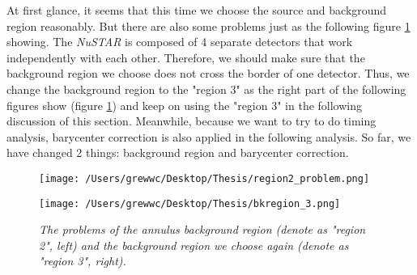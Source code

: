 \documentclass[12pt]{report}
\newcommand{\mycaption}[1]{\caption{\textit{\footnotesize #1}}}
\begin{document}
        \indent At first glance, it seems that this time we choose the source and background region reasonably. But 
        there %
        are also some problems just as the following figure \ref{fig:problems} showing. The \textit{NuSTAR} is 
        composed of 4 separate detectors that work independently with each other. Therefore, we should make sure that
        the background region we choose does not cross the border of one detector. Thus, we change the background 
        region to the "region 3" as the right part of the following figures show (figure
        \ref{fig:problems}) and keep on using the "region 3" in the following discussion of this section. Meanwhile,
        because we want to try to do timing analysis, barycenter correction is also applied in the following 
        analysis. So far, we have changed 2 things: background region and barycenter correction. 
        \begin{figure}[!ht]
          \begin{minipage}{0.45\textwidth}
            \begin{center} 
                \texttt{[image: /Users/grewwc/Desktop/Thesis/region2\_problem.png]}
            \end{center}
            \end{minipage}
          \begin{minipage}{0.45\textwidth}
            \begin{center}
            \texttt{[image: /Users/grewwc/Desktop/Thesis/bkregion\_3.png]}
            \end{center}
          \end{minipage}
          \centering
          \begin{minipage}{0.8\textwidth}
            \mycaption{The problems of the annulus background region (denote as "region 2", \textit{left}) and the 
            background region we choose again (denote as "region 3", \textit{right}).}
          \label{fig:problems}
          \end{minipage}
        \end{figure}
\end{document}
